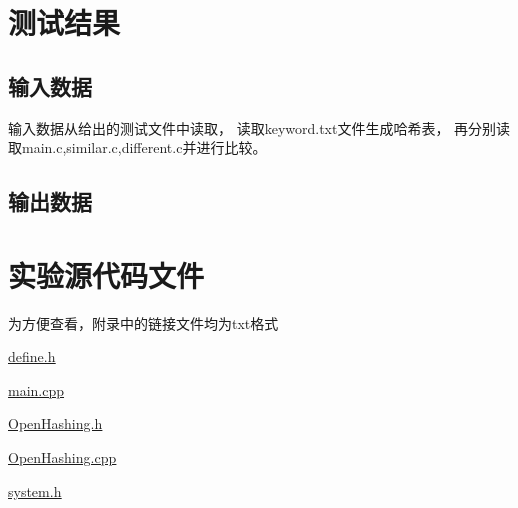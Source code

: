 \documentclass[a4paper]{article}
\begin{document}
	\section{测试结果}\label{sec:result}

	\subsection{输入数据}\label{subsec:in}
	{{输入数据从给出的测试文件中读取，
	读取keyword.txt文件生成哈希表，
	再分别读取main.c,similar.c,different.c并进行比较。}}

	\subsection{输出数据}\label{subsec:out}







	\noindent{ }



	\noindent{ }




	\appendix


	\section{实验源代码文件}\label{sec:appendix1}
	{{为方便查看，附录中的链接文件均为txt格式}}

	\href{../exp6/define.h.txt}{\underline{define.h}}

	\href{../exp6/main.cpp.txt}{\underline{main.cpp}}

	\href{../exp6/OpenHashing.h.txt}{\underline{OpenHashing.h}}

	\href{../exp6/OpenHashing.cpp.txt}{\underline{OpenHashing.cpp}}

	\href{../exp6/system.h.txt}{\underline{system.h}}
\end{document}
